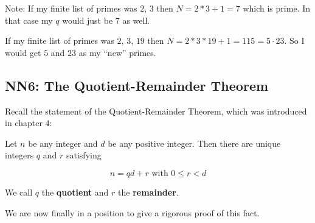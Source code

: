 Note:  If my finite list of primes was $2$, $3$ then $N = 2*3 + 1 = 7$ which is prime.  In that case my $q$ would just be $7$ as well.

If my finite list of primes was $2$, $3$, $19$ then $N = 2*3*19 + 1  = 115 = 5 \cdot 23$.  So I would get $5$ and $23$ as my ``new'' primes.

\subsection{NN6: The Quotient-Remainder Theorem}

Recall the statement of the Quotient-Remainder Theorem, which was introduced in chapter $4$:

\begin{theorem}
Let $n$ be any integer and $d$ be any positive integer. Then there are unique integers $q$ and $r$ satisfying

\[
n = qd + r \textrm{ with  $0 \leq r < d$}
\]

We call $q$ the \textbf{quotient} and $r$ the \textbf{remainder}.
	\end{theorem}

We are now finally in a position to give a rigorous proof of this fact.

